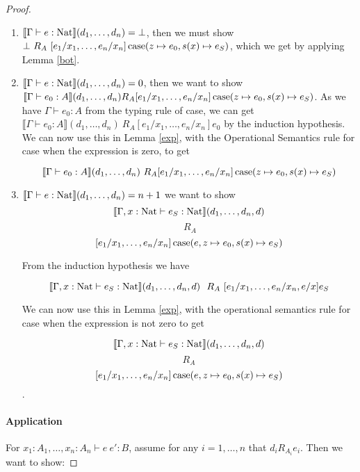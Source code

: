 \begin{proof}
\begin{enumerate}
\item{$\llbracket \Gamma \vdash e : \operatorname{Nat} \rrbracket (d_1, \dots, d_n) = \bot$, then we must show $\bot \ R_A \ [e_1/x_1, \dots, e_n/x_n] \\ \operatorname{case} (z \mapsto e_0, s(x) \mapsto e_S)$, which we get by applying Lemma \ref{bot}.}
\item{$\llbracket \Gamma \vdash e : \operatorname{Nat} \rrbracket (d_1, \dots, d_n) = 0$, then we want to show $\llbracket \Gamma \vdash e_0 : A \rrbracket (d_1, \dots, d_n) \ \\ R_A [e_1/x_1, \dots, e_n/x_n]\operatorname{case} (z \mapsto e_0, s(x) \mapsto e_S)$. As we have $\Gamma \vdash e_0 : A$ from the typing rule of case, we can get $\llbracket \Gamma \vdash e_0 : A \rrbracket (d_1, \dots, d_n) \ R_A [e_1/x_1, \dots, e_n/x_n]e_0$ by the induction hypothesis. We can now use this in Lemma \ref{exp}, with the Operational Semantics rule for case when the expression is zero, to get 

\[\llbracket \Gamma \vdash e_0 : A \rrbracket (d_1, \dots, d_n) \ R_A [e_1/x_1, \dots, e_n/x_n]\operatorname{case} (z \mapsto e_0, s(x) \mapsto e_S)\]
}
\item{$\llbracket \Gamma \vdash e : \operatorname{Nat} \rrbracket (d_1, \dots, d_n) = n+1$ we want to show
\[ \llbracket \Gamma, x : \operatorname{Nat} \vdash e_S : \operatorname{Nat} \rrbracket(d_1, \dots , d_n, d) \]
\[\ R_A \]
\[ [e_1/x_1, \dots, e_n/x_n]\operatorname{case} (e, z \mapsto e_0, s(x) \mapsto e_S)\]

From the induction hypothesis we have 

\[ \llbracket \Gamma, x : \operatorname{Nat} \vdash e_S : \operatorname{Nat} \rrbracket(d_1, \dots, d_n, d) \ \ R_A \ [e_1/x_1, \dots, e_n/x_n, e/x]e_S\]

We can now use this in Lemma \ref{exp}, with the operational semantics rule for case when the expression is not zero to get 

\[ \llbracket \Gamma, x : \operatorname{Nat} \vdash e_S : \operatorname{Nat} \rrbracket(d_1, \dots , d_n, d) \]
\[ R_A \]
\[ [e_1/x_1, \dots, e_n/x_n]\operatorname{case} (e, z \mapsto e_0, s(x) \mapsto e_S)\].


}
\end{enumerate}

\paragraph{Application} For $x_1 : A_1, \dots, x_n : A_n \vdash e \ e' : B$, assume for any $i = 1, \dots, n$ that $d_i R_{A_i} e_i$. Then we want to show:


\end{proof}
